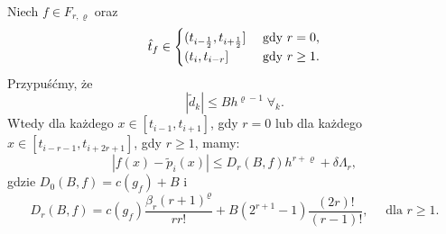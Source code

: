 \documentclass[oik, pdftex, robocza, man]{mgrwms}
\begin{document}
    \begin{lemma} \label{lem:algMP_3}
        Niech $f \in F_{r, \varrho}$ oraz 
        \begin{equation*}
            \hat{t}_{f} \in \begin{cases}
                (t_{i-\frac{1}{2}}, t_{i + \frac{1}{2}}]    &\text{ gdy } r=0, \\
                (t_{i}, t_{i - r}]                          &\text{ gdy } r \geq 1. \\
            \end{cases}
        \end{equation*}
        Przypuśćmy, że 
        \begin{equation} \label{eq:2}
            |\tilde{d}_{k}| \leq Bh^{\varrho-1} \; \forall_{k}.
        \end{equation}
        Wtedy dla każdego $x \in [t_{i-1}, t_{i+1}]$, gdy $r=0$ lub dla każdego $x \in [t_{i-r-1}, t_{i+2r+1}]$, gdy $r \geq 1$, mamy:
        \begin{equation*}
            |f(x) - \tilde{p}_{i}(x)| \leq D_{r}(B, f)h^{r+\varrho} + \delta\Lambda_{r},
        \end{equation*}
        gdzie $D_{0}(B,f) = c(g_{f}) + B$ i
        \begin{equation*}
            D_{r}(B, f)=c\left(g_{f}\right) \frac{\beta_{r}(r+1)^{\varrho}}{r r !}+B\left(2^{r+1}-1\right) \frac{(2 r) !}{(r-1) !}, \quad \text { dla } r \geq 1.
        \end{equation*}
    \end{lemma}
\end{document}
